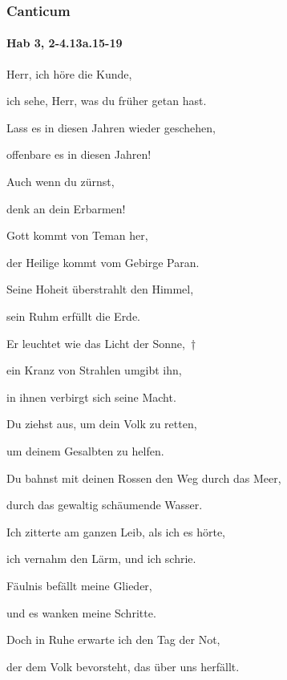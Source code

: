 \subsubsection{Canticum}

\paragraph{Hab 3, 2-4.13a.15-19}

\noindent Herr, ich höre die Kunde,~\GreStar{}~\nopagebreak

ich sehe, Herr, was du früher getan hast. 

\noindent Lass es in diesen Jahren wieder geschehen,~\GreStar{}~\nopagebreak

offenbare es in diesen Jahren! 

\noindent Auch wenn du zürnst,~\GreStar{}~\nopagebreak

denk an dein Erbarmen!

\noindent Gott kommt von Teman her,~\GreStar{}~\nopagebreak

der Heilige kommt vom Gebirge Paran. 

\noindent Seine Hoheit überstrahlt den Himmel,~\GreStar{}~\nopagebreak

sein Ruhm erfüllt die Erde.

\noindent Er leuchtet wie das Licht der Sonne,~†~\nopagebreak

ein Kranz von Strahlen umgibt ihn,~\GreStar{}~\nopagebreak

in ihnen verbirgt sich seine Macht.

\noindent Du ziehst aus, um dein Volk zu retten,~\GreStar{}~\nopagebreak

um deinem Gesalbten zu helfen.

\noindent Du bahnst mit deinen Rossen den Weg durch das Meer,~\GreStar{}~\nopagebreak

durch das gewaltig schäumende Wasser.

\noindent Ich zitterte am ganzen Leib, als ich es hörte,~\GreStar{}~\nopagebreak

ich vernahm den Lärm, und ich schrie. 

\noindent Fäulnis befällt meine Glieder,~\GreStar{}~\nopagebreak

und es wanken meine Schritte. 

\noindent Doch in Ruhe erwarte ich den Tag der Not,~\GreStar{}~\nopagebreak

der dem Volk bevorsteht, das über uns herfällt.

